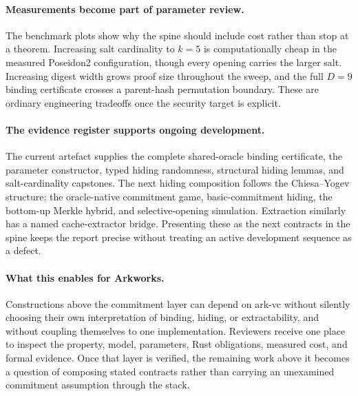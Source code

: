 \paragraph{Measurements become part of parameter review.}
The benchmark plots show why the spine should include cost rather than stop at
a theorem.  Increasing salt cardinality to $k=5$ is computationally cheap in
the measured Poseidon2 configuration, though every opening carries the larger
salt.  Increasing digest width grows proof size throughout the sweep, and the
full $D=9$ binding certificate crosses a parent-hash permutation boundary.
These are ordinary engineering tradeoffs once the security target is explicit.

\paragraph{The evidence register supports ongoing development.}
The current artefact supplies the complete shared-oracle binding certificate,
the parameter constructor, typed hiding randomness, structural hiding lemmas,
and salt-cardinality capstones.  The next hiding composition follows the
Chiesa--Yogev structure: the oracle-native commitment game, basic-commitment
hiding, the bottom-up Merkle hybrid, and selective-opening simulation.
Extraction similarly has a named cache-extractor bridge.  Presenting these as
the next contracts in the spine keeps the report precise without treating an
active development sequence as a defect.

\paragraph{What this enables for \textsf{Arkworks}.}
Constructions above the commitment layer can depend on \textsf{ark-vc} without
silently choosing their own interpretation of binding, hiding, or
extractability, and without coupling themselves to one implementation.
Reviewers receive one place to inspect the property, model, parameters, Rust
obligations, measured cost, and formal evidence.  Once that layer is verified,
the remaining work above it becomes a question of composing stated contracts
rather than carrying an unexamined commitment assumption through the stack.

